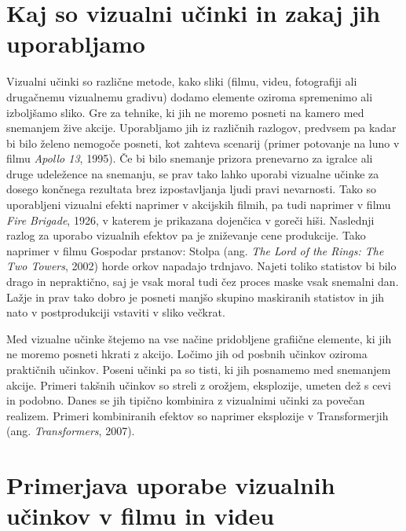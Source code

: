 \documentclass[a4paper, 12pt]{book}
\begin{document}

\section{Kaj so vizualni učinki in zakaj jih uporabljamo}

Vizualni učinki so različne metode, kako sliki (filmu, videu, fotografiji ali drugačnemu vizualnemu gradivu) dodamo elemente oziroma spremenimo ali izboljšamo sliko\cite{vesHandbook}.
Gre za tehnike, ki jih ne moremo posneti na kamero med snemanjem žive  akcije. %
Uporabljamo jih iz različnih razlogov, predvsem pa kadar bi bilo želeno nemogoče posneti, kot zahteva scenarij (primer potovanje na luno v filmu {\it Apollo 13}, 1995).
Če bi bilo snemanje prizora prenevarno za igralce ali druge udeležence na snemanju, se prav tako lahko uporabi vizualne učinke za dosego končnega rezultata brez izpostavljanja ljudi pravi nevarnosti. 
Tako so uporabljeni vizualni efekti naprimer v akcijskih filmih, pa tudi naprimer v filmu {\it Fire Brigade}, 1926, v katerem je prikazana dojenčica v goreči hiši. %
Naslednji razlog za uporabo vizualnih efektov pa je zniževanje cene produkcije. Tako naprimer v filmu Gospodar prstanov: Stolpa (ang. {\it The Lord of the Rings: The Two Towers}, 2002) horde orkov napadajo trdnjavo. Najeti toliko statistov bi bilo drago in nepraktično, saj je vsak moral tudi čez proces maske vsak snemalni dan. Lažje in prav tako dobro je posneti manjšo skupino maskiranih statistov in jih nato v postprodukciji vstaviti v sliko večkrat. 

Med vizualne učinke štejemo na vse načine pridobljene grafiične elemente, ki jih ne moremo posneti hkrati z akcijo. 
Ločimo jih od posbnih učinkov oziroma praktičnih učinkov.
Poseni učinki  pa so tisti, ki jih posnamemo med snemanjem akcije.
Primeri takšnih učinkov so streli z orožjem, eksplozije, umeten dež s cevi in podobno.
Danes se jih tipično kombinira z vizualnimi učinki za povečan realizem.
Primeri kombiniranih efektov so naprimer eksplozije v Transformerjih (ang. {\it Transformers}, 2007). %

\section{Primerjava uporabe vizualnih učinkov v filmu in videu}
\end{document}

